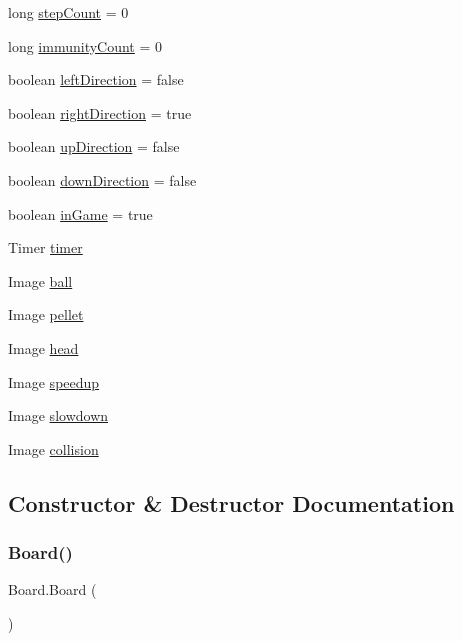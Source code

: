 \begin{DoxyCompactItemize}
\item 
long \hyperlink{class_board_a91e4464171d80a72609d5d2f25954d7b}{step\+Count} = 0
\item 
long \hyperlink{class_board_a74f7919c59b8bd512e8ff8a922583822}{immunity\+Count} = 0
\item 
boolean \hyperlink{class_board_a07aa50c4b704777f8693a35b319ada03}{left\+Direction} = false
\item 
boolean \hyperlink{class_board_a07dcadb0e102900ec4110e679e6e10f1}{right\+Direction} = true
\item 
boolean \hyperlink{class_board_a91c8cf23e650424074cb0cd1638541f8}{up\+Direction} = false
\item 
boolean \hyperlink{class_board_a2c4b39d098ee72bb293cbc75ba7c3ace}{down\+Direction} = false
\item 
boolean \hyperlink{class_board_ab0bb999b1b53db2a2d157003dece54ab}{in\+Game} = true
\item 
Timer \hyperlink{class_board_adeea39bf09dfd689ac9396d7c6d95995}{timer}
\item 
Image \hyperlink{class_board_a3d149787c3692d5d5ff0e14f31c4cf9a}{ball}
\item 
Image \hyperlink{class_board_a9fd625fd3b6a4cd34d32e9ecc9c7163f}{pellet}
\item 
Image \hyperlink{class_board_aa1544ac7c813a0a8ba3aec1e46c60971}{head}
\item 
Image \hyperlink{class_board_a0c27edfc2944b6ebbc34e7f041ab3bec}{speedup}
\item 
Image \hyperlink{class_board_ac831f1556734f69a7d70fe4e8725079c}{slowdown}
\item 
Image \hyperlink{class_board_a81bb96225cd77943f0fa0c3792f52422}{collision}
\end{DoxyCompactItemize}


\subsection{Constructor \& Destructor Documentation}
\mbox{\label{class_board_ab5e792f71e2fbff747bf7b52859f2a98}} 
\subsubsection{\texorpdfstring{Board()}{Board()}}
{\footnotesize\ttfamily Board.\+Board (\begin{DoxyParamCaption}{ }\end{DoxyParamCaption})}

